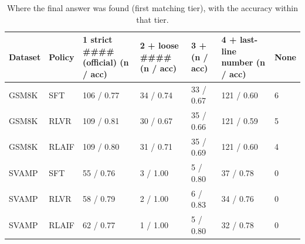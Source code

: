 \begin{table}[t]
\centering
\small
\caption{Where the final answer was found (first matching tier), with the accuracy within that tier.}
\begin{tabular}{lllllll}
\toprule
Dataset & Policy & 1 strict #### (official) (n / acc) & 2 + loose #### (n / acc) & 3 + \boxed{} (n / acc) & 4 + last-line number (n / acc) & None \\
\midrule
GSM8K & SFT & 106 / 0.77 & 34 / 0.74 & 33 / 0.67 & 121 / 0.60 & 6 \\
GSM8K & RLVR & 109 / 0.81 & 30 / 0.67 & 35 / 0.66 & 121 / 0.59 & 5 \\
GSM8K & RLAIF & 109 / 0.80 & 31 / 0.71 & 35 / 0.69 & 121 / 0.60 & 4 \\
SVAMP & SFT & 55 / 0.76 & 3 / 1.00 & 5 / 0.80 & 37 / 0.78 & 0 \\
SVAMP & RLVR & 58 / 0.79 & 2 / 1.00 & 6 / 0.83 & 34 / 0.76 & 0 \\
SVAMP & RLAIF & 62 / 0.77 & 1 / 1.00 & 5 / 0.80 & 32 / 0.78 & 0 \\
\bottomrule
\end{tabular}
\end{table}
